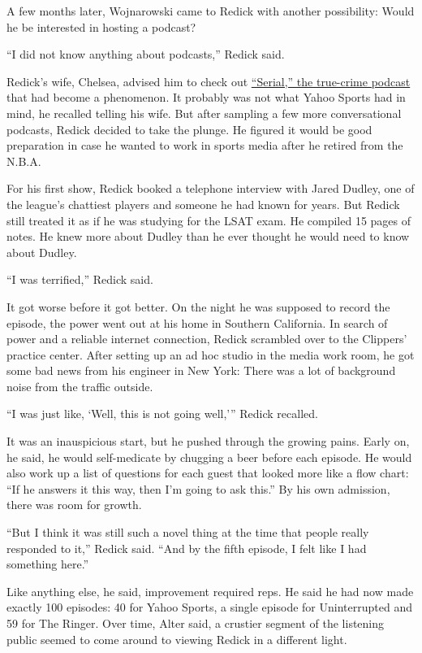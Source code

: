 A few months later, Wojnarowski came to Redick with another possibility:
Would he be interested in hosting a podcast?

``I did not know anything about podcasts,'' Redick said.

Redick's wife, Chelsea, advised him to check out
\href{https://serialpodcast.org/}{``Serial,'' the true-crime podcast}
that had become a phenomenon. It probably was not what Yahoo Sports had
in mind, he recalled telling his wife. But after sampling a few more
conversational podcasts, Redick decided to take the plunge. He figured
it would be good preparation in case he wanted to work in sports media
after he retired from the N.B.A.

For his first show, Redick booked a telephone interview with Jared
Dudley, one of the league's chattiest players and someone he had known
for years. But Redick still treated it as if he was studying for the
LSAT exam. He compiled 15 pages of notes. He knew more about Dudley than
he ever thought he would need to know about Dudley.

``I was terrified,'' Redick said.

It got worse before it got better. On the night he was supposed to
record the episode, the power went out at his home in Southern
California. In search of power and a reliable internet connection,
Redick scrambled over to the Clippers' practice center. After setting up
an ad hoc studio in the media work room, he got some bad news from his
engineer in New York: There was a lot of background noise from the
traffic outside.

``I was just like, `Well, this is not going well,''' Redick recalled.

It was an inauspicious start, but he pushed through the growing pains.
Early on, he said, he would self-medicate by chugging a beer before each
episode. He would also work up a list of questions for each guest that
looked more like a flow chart: ``If he answers it this way, then I'm
going to ask this.'' By his own admission, there was room for growth.

``But I think it was still such a novel thing at the time that people
really responded to it,'' Redick said. ``And by the fifth episode, I
felt like I had something here.''

Like anything else, he said, improvement required reps. He said he had
now made exactly 100 episodes: 40 for Yahoo Sports, a single episode for
Uninterrupted and 59 for The Ringer. Over time, Alter said, a crustier
segment of the listening public seemed to come around to viewing Redick
in a different light.

